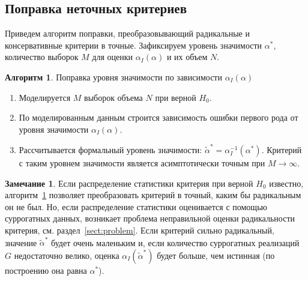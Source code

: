 \documentclass[specialist,
substylefile = spbu_report.rtx,
subf,href,colorlinks=true, 12pt]{disser}
\theoremstyle{definition}
\newtheorem{algorithm}{Алгоритм}
\newtheorem{remark}{Замечание}
\begin{document}
\subsection{Поправка неточных критериев}\label{sect:correction}
Приведем алгоритм поправки, преобразовывающий радикальные и консервативные критерии в точные. Зафиксируем уровень значимости $\alpha^*$, количество выборок $M$ для оценки $\alpha_I(\alpha)$ и их объем $N$.
\begin{algorithm}{Поправка уровня значимости по зависимости $\alpha_I(\alpha)$}~\cite{Larin_2022}\label{alg:correction}
	\begin{enumerate}
		\item Моделируется $M$ выборок объема $N$ при верной $H_0$.
		\item По моделированным данным строится зависимость ошибки первого рода от уровня значимости $\alpha_I(\alpha)$.
		\item Рассчитывается формальный уровень значимости: $\widetilde{\alpha}^*=\alpha_I^{-1}(\alpha^*)$. Критерий с таким уровнем значимости является асимптотически точным при $M\to\infty$.
	\end{enumerate}
\end{algorithm}

\begin{remark}\label{remark:large_G}
Если распределение статистики критерия при верной $H_0$ известно, алгоритм~\ref{alg:correction} позволяет преобразовать критерий в точный, каким бы радикальным он не был. Но, если распределение статистики оценивается с помощью суррогатных данных, возникает проблема неправильной оценки радикальности критерия, см. раздел~\ref{sect:problem}. Если критерий сильно радикальный, значение $\widetilde{\alpha}^*$ будет очень маленьким и, если количество суррогатных реализаций $G$ недостаточно велико, оценка $\alpha_I(\widetilde\alpha^*)$ будет больше, чем истинная (по построению она равна $\alpha^*$).

\end{remark}
\end{document}
